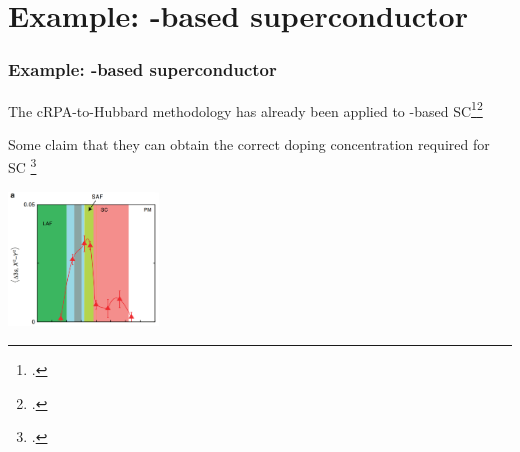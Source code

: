\documentclass{beamer}
\begin{document}
\section{Example: -based superconductor}


\begin{frame}
\frametitle{Example: -based superconductor}

The cRPA-to-Hubbard methodology has already been applied to -based SC\footcite{nakamura2008ab}\footcite{Miyake2010}

Some claim that they can obtain the correct doping concentration 
required for SC \footcite{misawa2014superconductivity}

\begin{center}
    \includegraphics[width=0.3\textwidth]{plots/fe-sc-hubbard-phase-1.png}
\end{center}

\end{frame}
\end{document}
